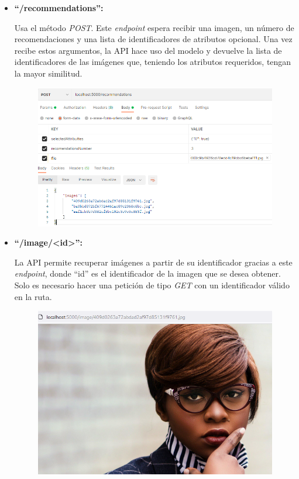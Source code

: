 \documentclass[12pt]{report} %
\begin{document}
	\begin{itemize}
		\item \textbf{``/recommendations'':}
		
		Usa el método \textit{POST}. Este \textit{endpoint} espera
		recibir una imagen, un número de recomendaciones y una lista de identificadores de atributos opcional. Una vez
		recibe estos argumentos, la API hace uso del modelo y devuelve la lista de identificadores de las imágenes que,
		teniendo los atributos requeridos, tengan la mayor similitud.
		\begin{figure}[H]
			{\includegraphics[scale=0.8]{postman-recommendations.png}}
		\end{figure}
		\item \textbf{``/image/<id>'':}
		
		La API permite recuperar imágenes a partir de su identificador gracias a este \textit{endpoint}, donde
		``id'' es el identificador de la imagen que se desea obtener. Solo es necesario hacer una petición de tipo \textit{GET}
		con un identificador válido en la ruta.
	
		\begin{figure}[H]
			{\includegraphics[scale=0.8]{ejemplo-peticion-imagen.png}}
		\end{figure}
	\end{itemize}
\end{document}
